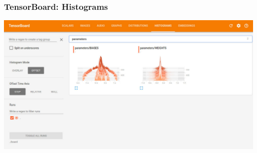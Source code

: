 %

\begin{frame}
	\MyLogo
	\frametitle{TensorBoard: Histograms}  
	
\centering\includegraphics[width=0.95\paperwidth]{figures/histograms.pdf} 
	
\end{frame}